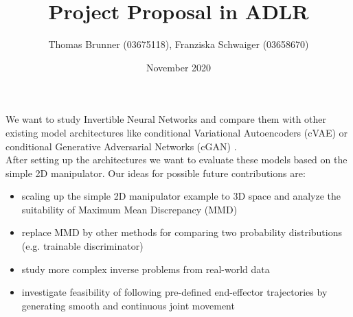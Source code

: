 \documentclass[12pt]{extarticle}
\title{Project Proposal in ADLR}
\author{Thomas Brunner (03675118), Franziska Schwaiger (03658670)}
\date{November 2020}
\begin{document}
\maketitle

We want to study Invertible Neural Networks \cite{Ardizzone2018} and compare them with other existing model architectures like conditional Variational Autoencoders (cVAE) \cite{Sohn2015} or conditional Generative Adversarial Networks (cGAN) \cite{Mehdi2018}.\\

After setting up the architectures we want to evaluate these models based on the simple 2D manipulator.
Our ideas for possible future contributions are:

\begin{itemize}
    \item scaling up the simple 2D manipulator example to 3D space and analyze the suitability of Maximum Mean Discrepancy (MMD) \cite{Gretton2008}
    \item replace MMD by other methods for comparing two probability distributions (e.g. trainable discriminator)
    \item study more complex inverse problems from real-world data
    \item investigate feasibility of following pre-defined end-effector trajectories
          by generating smooth and continuous \cite{Zhou2019} joint movement
\end{itemize}



\end{document}
